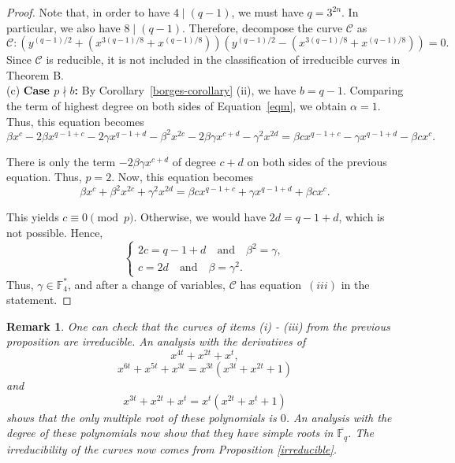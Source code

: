 \documentclass[preprint,12pt]{elsarticle}
\newtheorem{remark}[theorem]{Remark}
\begin{document}
\begin{proof}
Note that, in order to have $4 \mid (q - 1)$, we must have $q = 3^{2n}$. In particular, we also have $8 \mid (q - 1)$. Therefore, decompose the curve $\mathcal{C}$ as
$$\mathcal{C}: (y^{(q - 1)/2} + (x^{3(q - 1)/8} + x^{(q - 1)/8}))(y^{(q - 1)/2} - (x^{3(q - 1)/8} + x^{(q - 1)/8})) = 0.$$
Since $\mathcal{C}$ is reducible,  it is not included in the classification of irreducible curves in Theorem B.
\\

\noindent (c) \textbf{Case $p \nmid b$:} By Corollary~\ref{borges-corollary} (ii), we have $b = q - 1$.
Comparing the term of highest degree on both sides of Equation~\eqref{eqm}, we obtain $\alpha = 1$.
Thus, this equation becomes
\begin{equation*}
\beta x^c - 2\beta x^{q-1+c} - 2\gamma x^{q-1+d}
- \beta^2 x^{2c} - 2\beta\gamma x^{c+d} - \gamma^2 x^{2d}
= \beta c x^{q-1+c} - \gamma x^{q-1+d} - \beta c x^c.
\end{equation*}

There is only the term $-2\beta\gamma x^{c+d}$ of degree $c+d$ on both sides of the previous equation.
Thus, $p = 2$.
Now, this equation becomes
\begin{equation*}
\beta x^c + \beta^2 x^{2c} + \gamma^2 x^{2d}
= \beta c x^{q-1+c} + \gamma x^{q-1+d} + \beta c x^c.
\end{equation*}

This yields $c \equiv 0 \pmod{p}$.
Otherwise, we would have $2d = q - 1 + d$, which is not possible.
Hence,
\[
\begin{cases}
2c = q - 1 + d \quad \text{and} \quad \beta^2 = \gamma, \\
c = 2d \quad \text{and} \quad \beta = \gamma^2.
\end{cases}
\]
Thus, $\gamma \in \mathbb{F}_4^{*}$, and after a change of variables, $\mathcal{C}$ has equation~$(iii)$ in the statement.
\end{proof}

\begin{remark}
    One can check that the curves of items (i) - (iii) from the previous proposition are irreducible. An analysis with the derivatives of
    $$x^{4t} + x^{2t} + x^t,$$
    $$x^{6t} + x^{5t} + x^{3t} = x^{3t}(x^{3t} + x^{2t} + 1)$$
    and
    $$x^{3t} + x^{2t} + x^t = x^t(x^{2t} + x^t + 1)$$
    shows that the only multiple root of these polynomials is $0$. An analysis with the degree of these polynomials now show that they have simple roots in $\overline{\mathbb{F}_q}$. The irreducibility of the curves now comes from Proposition \ref{irreducible}.
\end{remark}
\end{document}
